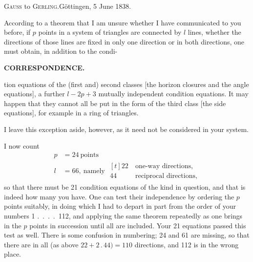 \bigskip
\begin{center}\textsc{Gauss} to \textsc{Gerling}.\quad Göttingen, 5 June 1838.\end{center}

According to a theorem that I am unsure whether I have communicated to you before,
if $p$ points in a system of triangles are connected by $l$ lines, whether
the directions of those lines are fixed in only one direction or in both
directions, one must obtain, in addition to the condi-\par
\makeatletter
\def\ps@gaussIXfortyonestar{\def\@oddhead{}\def\@evenhead{}\def\@oddfoot{\hfil41\textsuperscript{*}\hspace{2em}}\let\@evenfoot\@oddfoot}
\makeatother
\thispagestyle{gaussIXfortyonestar}
\clearpage
{}\hfill\textbf{CORRESPONDENCE.}\par\medskip
\noindent tion equations of the (first and) second classes [the horizon closures
and the angle equations], a further $l-2p+3$ mutually independent condition
equations.  It may happen that they cannot all
be put in the form of the third class [the side equations], for example in
a ring of triangles.
\begin{center}
\end{center}

I leave this exception aside, however, as it need not be considered in your
system.

I now count
\[
\begin{aligned}
p&=24\ \text{points}\\
l&=66,\ \text{namely }\begin{aligned}[t]22\ &\text{one-way directions,}\\44\ &\text{reciprocal directions,}\end{aligned}
\end{aligned}
\]
so that there must be 21 condition equations of the kind in question, and
that is indeed how many you have. One can test their independence by
ordering the $p$ points suitably, in doing which I had to depart in part from the
order of your numbers 1 .\ .\ .\ .\ 112, and applying the same theorem
repeatedly as one brings in the $p$ points in succession until all are
included. Your 21 equations passed this test as well. There is some
confusion in  numbering; 24 and 61 are missing, so that there
are in all (as above $22+2\mathbin{.}44)=110$ directions, and 112 is in the wrong place.

